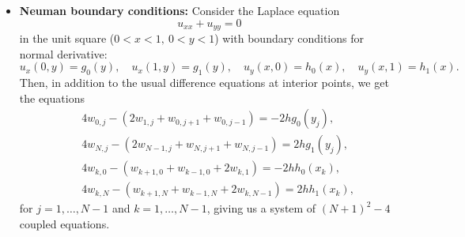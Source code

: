 \documentclass[12pt]{article}
\begin{document}
\begin{itemize}
\item \textbf{Neuman boundary conditions:}
Consider the Laplace equation
\[
u_{xx}+u_{yy} =0  
\]
in the unit square ($0<x<1, \ 0<y<1$) with boundary conditions for normal derivative:
\[
u_{x}(0,y) =g_{0}(y), \quad u_{x}(1,y) =g_{1}(y), \quad u_{y}(x,0)=h_{0}(x), \quad
u_{y}(x,1) = h_{1}(x). 
\]
Then, in addition to the usual difference equations at interior points, we get the equations
\begin{eqnarray*}
&&4w_{0,j}-\left(2w_{1,j}+w_{0,j+1}+w_{0,j-1}\right)
=-2h g_{0}(y_j), \label{gg104} \\
&&4w_{N,j}-\left(2w_{N-1,j}+w_{N,j+1}+w_{N,j-1}\right)
=2h g_{1}(y_j), \label{gg105} \\
&&4w_{k,0}-\left(w_{k+1,0}+w_{k-1,0}+2w_{k,1}\right)
=-2h h_{0}(x_k), \label{gg106} \\
&&4w_{k,N}-\left(w_{k+1,N}+w_{k-1,N}+2w_{k,N-1}\right)
=2h h_{1}(x_k),
\end{eqnarray*}
for $j=1,\dots,N-1$ and $k=1,\dots, N-1$,
giving us a system of $(N+1)^2-4$ coupled equations.


\end{itemize}
\end{document}
